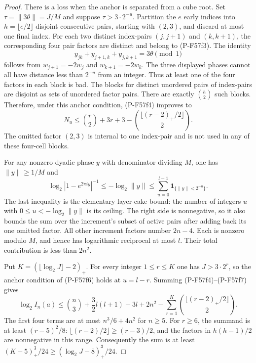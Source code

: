 \begin{proof}
There is a loss when the anchor is separated from a cube
root. Set $\tau=\|3\theta\|=J/M$ and suppose
$\tau>3\cdot2^{-u}$.
Partition the $e$ early indices into
$h=\lfloor e/2\rfloor$ disjoint consecutive pairs,
starting with $(2,3)$, and discard at most one final index.
For each two distinct index-pairs $(j,j+1)$ and $(k,k+1)$,
the corresponding four pair factors are distinct and
belong to (P-F57f3). The identity
\[
          y_{jk}+y_{j+1,k}+y_{j,k+1}=3\theta
                                      \pmod1
 \tag{P-F57f5}
\]
follows from $w_{j+1}=-2w_j$ and $w_{k+1}=-2w_k$.
The three displayed phases cannot all have distance
less than $2^{-u}$ from an integer. Thus at least one
of the four factors in each block is bad.
The blocks for distinct unordered pairs of index-pairs
are disjoint as sets of unordered factor pairs.
There are exactly $\binom h2$ such blocks. Therefore,
under this anchor condition, (P-F57f4) improves to
\[
       N_u\le\binom r2+3r+3
              -\binom{\lfloor(r-2)_+/2\rfloor}{2}.
 \tag{P-F57f6}
\]
The omitted factor $(2,3)$ is internal to one index-pair
and is not used in any of these four-cell blocks.

For any nonzero dyadic phase $y$ with denominator dividing
$M$, one has $\|y\|\ge1/M$ and
\[
 \log_2|1-e^{2\pi iy}|^{-1}
 \le-\log_2\|y\|
 \le\sum_{u=0}^{l-1}\mathbf1_{\{\|y\|<2^{-u}\}}.
 \tag{P-F57f7}
\]
The last inequality is the elementary layer-cake bound:
the number of integers $u$ with $0\le u< -\log_2\|y\|$
is its ceiling. The right side is nonnegative, so it
also bounds the sum over the increment's subset of active
pairs after adding back its one omitted factor.
All other increment factors number $2n-4$.
Each is nonzero modulo $M$, and hence has logarithmic
reciprocal at most $l$. Their total contribution is
less than $2n^2$.

Put $K=(\lfloor\log_2J\rfloor-2)_+$.
For every integer $1\le r\le K$ one has
$J>3\cdot2^r$, so the anchor condition of (P-F57f6)
holds at $u=l-r$.
Summing (P-F57f4)--(P-F57f7) gives
\[
 \log_2 I_n(a)
 \le\binom n3+\frac32l(l+1)+3l+2n^2
       -\sum_{r=1}^K
                  \binom{\lfloor(r-2)_+/2\rfloor}{2}.
 \tag{P-F57f8}
\]
The first four terms are at most $n^3/6+4n^2$ for $n\ge5$.
For $r\ge6$, the summand is at least $(r-5)^2/8$:
$\lfloor(r-2)/2\rfloor\ge(r-3)/2$, and the factors
in $h(h-1)/2$ are nonnegative in this range.
Consequently the sum is at least
$(K-5)_+^3/24\ge(\log_2J-8)_+^3/24$.


\end{proof}
